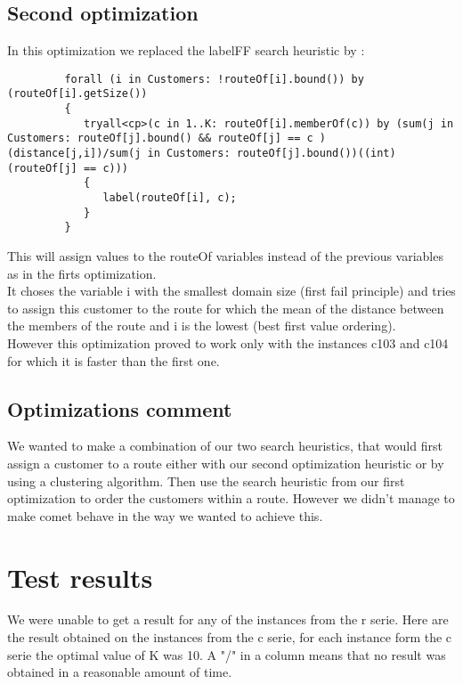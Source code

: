 \documentclass{eplDoc}
\begin{document}
\subsection{Second optimization}
In this optimization we replaced the labelFF search heuristic by : 
\begin{lstlisting}
         forall (i in Customers: !routeOf[i].bound()) by (routeOf[i].getSize())
         {
            tryall<cp>(c in 1..K: routeOf[i].memberOf(c)) by (sum(j in Customers: routeOf[j].bound() && routeOf[j] == c )(distance[j,i])/sum(j in Customers: routeOf[j].bound())((int)(routeOf[j] == c)))
            {   
               label(routeOf[i], c);
            }
         } \end{lstlisting}


This will assign values to the routeOf variables instead of the previous variables as in the firts optimization. \\ 
It choses the variable i with the smallest domain size (first fail principle) and tries to assign this customer to the route for which the mean of the distance between the members of the route and i is the lowest (best first value ordering). \\ 
However this optimization proved to work only with the instances c103 and c104 for which it is faster than the first one. \\

\subsection{Optimizations comment} 
We wanted to make a combination of our two search heuristics, that would first assign a customer to a route either with our second optimization heuristic or by using a clustering algorithm. Then use the search heuristic from our first optimization to order the customers within a route. However we didn't manage to make comet behave in the way we wanted to achieve this. 

\section{Test results}

We were unable to get a result for any of the instances from the r serie. Here are the result obtained on the instances from the c serie, for each instance form the c serie the optimal value of K was 10. A "/" in a column means that no result was obtained in a reasonable amount of time.  
\end{document}
